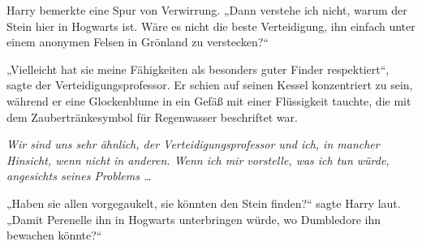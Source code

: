 Harry bemerkte eine Spur von Verwirrung.
„Dann verstehe ich nicht, warum der Stein hier in Hogwarts ist. Wäre es nicht die beste Verteidigung, ihn einfach unter einem anonymen Felsen in Grönland zu verstecken?“

„Vielleicht hat sie meine Fähigkeiten als besonders guter Finder respektiert“, sagte der Verteidigungsprofessor.
Er schien auf seinen Kessel konzentriert zu sein, während er eine Glockenblume in ein Gefäß mit einer Flüssigkeit tauchte, die mit dem Zaubertränkesymbol für Regenwasser beschriftet war.

\emph{Wir sind uns sehr ähnlich, der Verteidigungsprofessor und ich, in mancher Hinsicht, wenn nicht in anderen. Wenn ich mir vorstelle, was ich tun würde, angesichts seines Problems …}

„Haben sie allen vorgegaukelt, sie könnten den Stein finden?“ sagte Harry laut.
„Damit Perenelle ihn in Hogwarts unterbringen würde, wo Dumbledore ihn bewachen könnte?“

